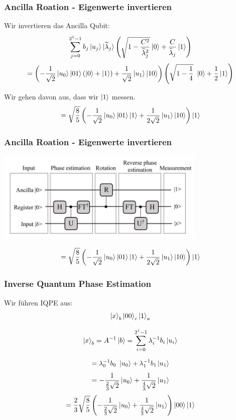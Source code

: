 \begin{frame}
    \frametitle{Ancilla Roation - Eigenwerte invertieren}
    Wir invertieren das Ancilla Qubit:
    $$\sum_{j=0}^{2^{1}-1} b_j \ket{u_j} \ket{\widetilde{\lambda}_j} \left(\sqrt{1-\frac{C^2}{\widetilde{\lambda}_j^2}}\ket{0} + \frac{C}{\widetilde{\lambda}_j} \ket{1}\right)$$
    $$=\left(-\frac{1}{\sqrt{2}} \ket{u_0} \ket{01}\left(\ket{0} +\ket{1}\right)+\frac{1}{\sqrt{2}} \ket{u_1} \ket{10}\right)\left(\sqrt{1-\frac{1}{4}}\ \ket{0} + \frac{1}{2} \ket{1}\right)$$

    \hfil

    \hfil

    Wir gehen davon aus, dass wir $\ket{1}$ messen.
    $$  =\sqrt{\frac{8}{5}}\left(-\frac{1}{\sqrt{2}} \ket{u_0}\ket{01}\ket{1} +\frac{1}{2\sqrt{2}} \ket{u_1} \ket{10}\right)\ket{1}$$
\end{frame}

\begin{frame}
    \frametitle{Ancilla Roation - Eigenwerte invertieren}
    \begin{center}
    \includegraphics[width=10cm]{img/hhl_circuit.jpg}
    \end{center}

    $$  =\sqrt{\frac{8}{5}}\left(-\frac{1}{\sqrt{2}} \ket{u_0}\ket{01}\ket{1} +\frac{1}{2\sqrt{2}} \ket{u_1} \ket{10}\right)\ket{1}$$
\end{frame}



\begin{frame}
    \frametitle{Inverse Quantum Phase Estimation}
    Wir führen IQPE aus:
    $$\ket{x}_b \ket{00}_c \ket{1}_a $$
    
    $$ \ket{x}_b =  A^{-1} \ket{b} = 
    \sum_{i=0}^{2^{1}-1} 
    \lambda_i^{-1} b_i\ket{u_i} $$

    $$=\lambda_0^{-1} b_0\  \ket{u_0} +  \lambda_1^{-1} b_1\ket{u_1}$$
    $$=-\frac{1}{\frac{2}{3}\sqrt{2}} \ket{u_0} +\frac{1}   {\frac{4}{3}\sqrt{2}}  \ket{u_1}$$
    $$=\frac{2}{3}\sqrt{\frac{8}{5}} \left( -\frac{1}{\frac{2}{3}\sqrt{2}} \ket{u_0} +\frac{1}   {\frac{4}{3}\sqrt{2}}  \ket{u_1}\right)  \ket{00} \ket{1} $$

\end{frame}


